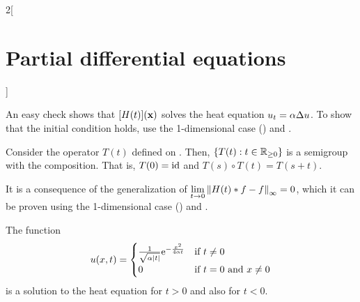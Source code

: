 \documentclass[../../../main_math.tex]{subfiles}
\begin{document}
\begin{multicols}{2}[\section{Partial differential equations}]
\begin{proposition}
  \end{proposition}
  \begin{sproof}
    An easy check shows that $[H(t)](\boldsymbol{\mathrm{x}})$ solves the heat equation $u_t=\alpha\Delta u$. To show that the initial condition holds, use the 1-dimensional case () and .
  \end{sproof}
  \begin{proposition}
    Consider the operator $T(t)$ defined on . Then, $\{T(t):t\in\mathbb{R}_{\geq 0}\}$ is a semigroup with the composition. That is, $T(0)=\mathrm{id}$ and $T(s)\circ T(t)=T(s+t)$.
  \end{proposition}
  \begin{sproof}
    It is a consequence of the generalization of $\displaystyle\lim_{t\to 0}\left\|H(t)*f - f\right\|_\infty=0$, which it can be proven using the 1-dimensional case () and .
  \end{sproof}
  \begin{lemma}
    The function
    \begin{equation*}
      u(x,t)=\begin{cases}
        \frac{1}{\sqrt{\alpha\abs{t}}}\mathrm{e}^{-\frac{x^2}{4\alpha t}} & \text{if $t\ne 0$}           \\
        0                                                          & \text{if $t=0$ and $x\ne 0$}
      \end{cases}
    \end{equation*}
    is a solution to the heat equation for $t>0$ and also for $t<0$.
  \end{lemma}

\end{multicols}
\end{document}
